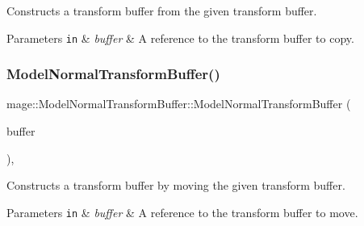 Constructs a transform buffer from the given transform buffer.


\begin{DoxyParams}[1]{Parameters}
\mbox{\tt in}  & {\em buffer} & A reference to the transform buffer to copy. \\
\hline
\end{DoxyParams}
\hypertarget{structmage_1_1_model_normal_transform_buffer_a8af074b84d44bc22d047420f241dc85e}{}\label{structmage_1_1_model_normal_transform_buffer_a8af074b84d44bc22d047420f241dc85e} 
\subsubsection{\texorpdfstring{Model\+Normal\+Transform\+Buffer()}{ModelNormalTransformBuffer()}\hspace{0.1cm}{\footnotesize\ttfamily [3/3]}}
{\footnotesize\ttfamily mage\+::\+Model\+Normal\+Transform\+Buffer\+::\+Model\+Normal\+Transform\+Buffer (\begin{DoxyParamCaption}\item[{\hyperlink{structmage_1_1_model_normal_transform_buffer}{Model\+Normal\+Transform\+Buffer} \&\&}]{buffer }\end{DoxyParamCaption})\hspace{0.3cm}{\ttfamily [default]}, {\ttfamily [noexcept]}}

Constructs a transform buffer by moving the given transform buffer.


\begin{DoxyParams}[1]{Parameters}
\mbox{\tt in}  & {\em buffer} & A reference to the transform buffer to move. \\
\hline
\end{DoxyParams}
\hypertarget{structmage_1_1_model_normal_transform_buffer_a157d1f7cc47463f6b589d25c039ec418}{}\label{structmage_1_1_model_normal_transform_buffer_a157d1f7cc47463f6b589d25c039ec418} 
